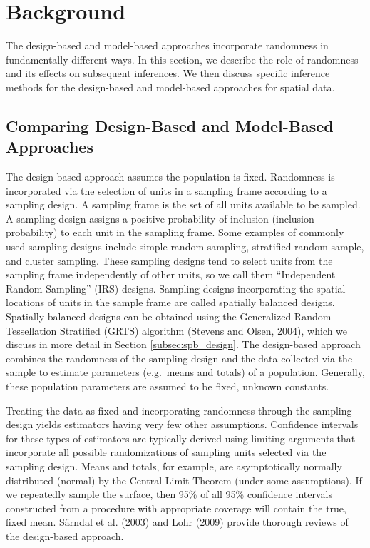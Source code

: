 \documentclass[]{elsarticle} %
\begin{document}
\hypertarget{sec:background}{%
\section{Background}\label{sec:background}}

The design-based and model-based approaches incorporate randomness in
fundamentally different ways. In this section, we describe the role of
randomness and its effects on subsequent inferences. We then discuss
specific inference methods for the design-based and model-based
approaches for spatial data.

\hypertarget{subsec:dvm_compare}{%
\subsection{Comparing Design-Based and Model-Based
Approaches}\label{subsec:dvm_compare}}

The design-based approach assumes the population is fixed. Randomness is
incorporated via the selection of units in a sampling frame according to
a sampling design. A sampling frame is the set of all units available to
be sampled. A sampling design assigns a positive probability of
inclusion (inclusion probability) to each unit in the sampling frame.
Some examples of commonly used sampling designs include simple random
sampling, stratified random sample, and cluster sampling. These sampling
designs tend to select units from the sampling frame independently of
other units, so we call them ``Independent Random Sampling'' (IRS)
designs. Sampling designs incorporating the spatial locations of units
in the sample frame are called spatially balanced designs. Spatially
balanced designs can be obtained using the Generalized Random
Tessellation Stratified (GRTS) algorithm (Stevens and Olsen, 2004),
which we discuss in more detail in Section \ref{subsec:spb_design}. The
design-based approach combines the randomness of the sampling design and
the data collected via the sample to estimate parameters (e.g.~means and
totals) of a population. Generally, these population parameters are
assumed to be fixed, unknown constants.

Treating the data as fixed and incorporating randomness through the
sampling design yields estimators having very few other assumptions.
Confidence intervals for these types of estimators are typically derived
using limiting arguments that incorporate all possible randomizations of
sampling units selected via the sampling design. Means and totals, for
example, are asymptotically normally distributed (normal) by the Central
Limit Theorem (under some assumptions). If we repeatedly sample the
surface, then 95\% of all 95\% confidence intervals constructed from a
procedure with appropriate coverage will contain the true, fixed mean.
Särndal et al. (2003) and Lohr (2009) provide thorough reviews of the
design-based approach.
\end{document}
